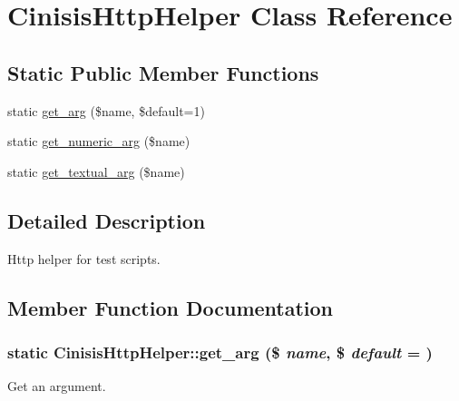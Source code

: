 \hypertarget{classCinisisHttpHelper}{
\section{CinisisHttpHelper Class Reference}
\label{classCinisisHttpHelper}
}
\subsection*{Static Public Member Functions}
\begin{DoxyCompactItemize}
\item 
static \hyperlink{classCinisisHttpHelper_aabbbd96f654baf3086dfb83728b581fa}{get\_\-arg} (\$name, \$default=1)
\item 
static \hyperlink{classCinisisHttpHelper_ac61168ccb1eb83a15bb82b012759d67e}{get\_\-numeric\_\-arg} (\$name)
\item 
static \hyperlink{classCinisisHttpHelper_aa4c258abb234e9585d2215dfa44247ee}{get\_\-textual\_\-arg} (\$name)
\end{DoxyCompactItemize}


\subsection{Detailed Description}
Http helper for test scripts. 

\subsection{Member Function Documentation}
\hypertarget{classCinisisHttpHelper_aabbbd96f654baf3086dfb83728b581fa}{
\subsubsection[{get\_\-arg}]{\setlength{\rightskip}{0pt plus 5cm}static CinisisHttpHelper::get\_\-arg (\$ {\em name}, \/  \$ {\em default} = {})}}
\label{classCinisisHttpHelper_aabbbd96f654baf3086dfb83728b581fa}
Get an argument.


